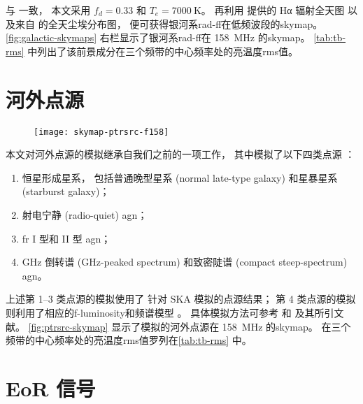 与  一致，
本文采用 $f_d = 0.33$ 和 $T_e = \SI{7000}{\kelvin}$。
再利用  提供的 Hα 辐射全天图
以及来自  的全天尘埃分布图，
便可获得银河系\ac{rad-ff}在低频波段的\ac{skymap}。
\autoref{fig:galactic-skymaps} 右栏显示了银河系\ac{rad-ff}在
\SI{158}{\MHz} 的\ac{skymap}。
\autoref{tab:tb-rms} 中列出了该前景成分在三个频带的中心频率处的亮温度\ac{rms}值。


\section{河外点源}
\label{sec:simu-eg-point}

\begin{figure}[htp]
  \centering
  \texttt{[image: skymap-ptrsrc-f158]}
  \label{fig:ptrsrc-skymap}
\end{figure}

本文对河外点源的模拟继承自我们之前的一项工作\cite{wang2010}，
其中模拟了以下四类点源 \cite{snellen2000,wilman2008,wang2010}：
\begin{enumerate}
  \item 恒星形成星系，
    包括普通晚型星系 (normal late-type galaxy) 和星暴星系 (starburst galaxy)；
  \item 射电宁静 (radio-quiet) \ac{agn}；
  \item \ac{fr} I 型和 II 型 \ac{agn}；
  \item GHz 倒转谱 (GHz-peaked spectrum)
    和致密陡谱 (compact steep-spectrum) \ac{agn}。
\end{enumerate}
上述第 1--3 类点源的模拟使用了  针对 SKA 模拟的点源结果；
第 4 类点源的模拟则利用了相应的\ac{f-luminosity}和频谱模型
\cite{oDea1998,snellen1998,fanti2001}。
具体模拟方法可参考  和  及其所引文献。
\autoref{fig:ptrsrc-skymap} 显示了模拟的河外点源在 \SI{158}{\MHz} 的\ac{skymap}。
在三个频带的中心频率处的亮温度\ac{rms}值罗列在\autoref{tab:tb-rms} 中。


\section{EoR 信号}
\label{sec:simu-eor}

